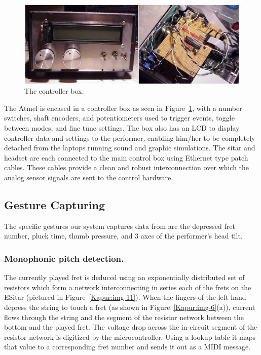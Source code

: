 \begin{figure}[t]
\centering
\includegraphics[width=\textwidth]{img-7-eps-converted-to-crop.pdf}      
\caption{The controller box.}
\label{Kapur:img-7}       %
\end{figure}


The Atmel is encased in a controller box as seen in Figure~\ref{Kapur:img-7}, with a number
switches, shaft encoders, and potentiometers used to trigger events, toggle
between modes, and fine tune settings. The box also has an LCD to display
controller data and settings to the performer, enabling him/her to be completely
detached from the laptops running sound and graphic simulations. The sitar and
headset are each connected to the main control box using Ethernet type patch
cables. These cables provide a clean and robust interconnection over which the
analog sensor signals are sent to the control hardware.

\subsection{Gesture Capturing}

The specific gestures our system captures data from are the depressed fret
number, pluck time, thumb pressure, and 3 axes of the performer's head tilt.

\subsubsection{Monophonic pitch detection.}

The currently played fret is deduced using an exponentially distributed set of
resistors which form a network interconnecting in series each of the frets on the
ESitar (pictured in Figure~\ref{Kapur:img-11}).  When the fingers of the left hand
depress the string to touch a fret (as shown in Figure~\ref{Kapur:img-6}(a)), current flows
through the string and the segment of the resistor network between the bottom and
the played fret. The voltage drop across the in-circuit segment of the resistor
network is digitized by the microcontroller. Using a lookup table it maps that
value to a corresponding fret number and sends it out as a MIDI message.


